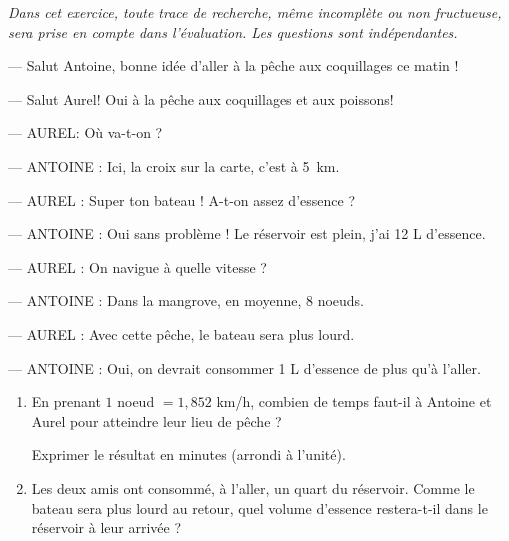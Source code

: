 
\medskip

\emph{Dans cet exercice, toute trace de recherche, même incomplète ou non fructueuse, sera prise en compte dans l'évaluation. Les questions sont indépendantes.}

\bigskip

\og --- Salut Antoine, bonne idée d'aller à la pêche aux coquillages ce matin !

--- Salut Aurel! Oui à la pêche aux coquillages et aux poissons!

--- AUREL: Où va-t-on ?

--- ANTOINE : Ici, la croix sur la carte, c'est à 5~km.

--- AUREL : Super ton bateau ! A-t-on assez d'essence ?

--- ANTOINE : Oui sans problème ! Le réservoir est plein, j'ai 12 L d'essence.

--- AUREL : On navigue à quelle vitesse ?

--- ANTOINE : Dans la mangrove, en moyenne, 8 noeuds.

--- AUREL : Avec cette pêche, le bateau sera plus lourd.

--- ANTOINE : Oui, on devrait consommer 1 L d'essence de plus qu'à l'aller.\fg

\medskip

\begin{enumerate}
\item En prenant $1$ noeud $= 1,852$ km/h, combien de temps faut-il à Antoine et Aurel pour atteindre leur lieu de pêche ? 

Exprimer le résultat en minutes
(arrondi à l'unité).
\item Les deux amis ont consommé, à l'aller, un quart du réservoir. Comme le bateau sera plus
lourd au retour, quel volume d'essence restera-t-il dans le réservoir à leur arrivée ?
\end{enumerate}

\vspace{0,5cm}

